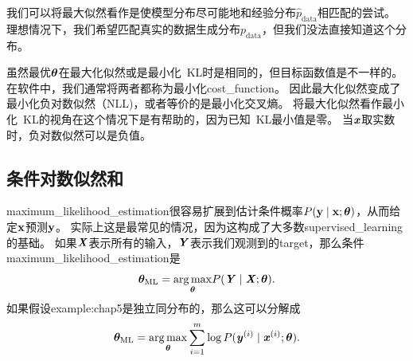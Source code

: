 我们可以将最大似然看作是使模型分布尽可能地和经验分布$\hat{p}_{\text{data}}$相匹配的尝试。
理想情况下，我们希望匹配真实的数据生成分布$p_{\text{data}}$，但我们没法直接知道这个分布。

虽然最优$\boldsymbol{\theta}$在最大化似然或是最小化~\gls{KL}时是相同的，但目标函数值是不一样的。
在软件中，我们通常将两者都称为最小化\gls{cost_function}。
因此最大化似然变成了最小化负对数似然（NLL)，或者等价的是最小化交叉熵。
将最大化似然看作最小化~\gls{KL}的视角在这个情况下是有帮助的，因为已知~\gls{KL}最小值是零。
当$\boldsymbol{\mathit{x}}$取实数时，负对数似然可以是负值。

\subsection{条件对数似然和}
\label{sec:conditional_log_likelihood_and_mean_squared_error}
\gls{maximum_likelihood_estimation}很容易扩展到估计条件概率$P(\mathbf{y} \mid \mathbf{x};\boldsymbol{\theta})$，从而给定$\mathbf{x}$预测$\mathbf{y}$。
实际上这是最常见的情况，因为这构成了大多数\gls{supervised_learning}的基础。
如果$\boldsymbol{\mathit{X}}$表示所有的输入，$\boldsymbol{\mathit{Y}}$表示我们观测到的\gls{target}，那么条件\gls{maximum_likelihood_estimation}是
\begin{equation}
    \boldsymbol{\theta}_{\text{ML}} = \underset{\boldsymbol{\theta}}{\arg\max} P(\boldsymbol{\mathit{Y}} \mid \boldsymbol{\mathit{X}}; \boldsymbol{\theta}).
\end{equation}
如果假设\gls{example:chap5}是独立同分布的，那么这可以分解成
\begin{equation}
\label{eq:5.63}
    \boldsymbol{\theta}_{\text{ML}} = \underset{\boldsymbol{\theta}}{\arg\max} \sum_{i=1}^m \log P(\boldsymbol{\mathit{y}}^{(i)} \mid \boldsymbol{\mathit{x}}^{(i)}; \boldsymbol{\theta}).
\end{equation}


